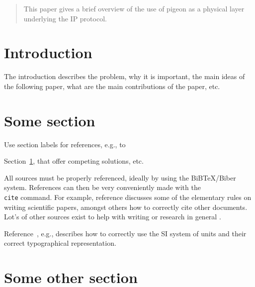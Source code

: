 %
% 


\begin{abstract}
  This paper gives a brief overview of the use of pigeon as a physical
  layer underlying  the IP protocol. 
\end{abstract}


\section{Introduction}
\label{sec:introduction}

The introduction describes the problem, why it is important, the main
ideas of the following paper, what are the main contributions of the
paper, etc. 

\section{Some section}
\label{sec:relwork}

Use section labels for references, e.g., to

Section~\ref{sec:introduction}, that offer competing solutions, etc.

All sources must be properly referenced, ideally by using the
BiBTeX/Biber system. References can then be very conveniently made
with the \texttt{\\cite} command. For example, reference
\cite{leuwen00:_handb_schol} discusses some of the elementary rules on
writing scientific papers, amongst others how to correctly cite other
documents.  Lot's of other sources exist to help with writing
\cite{williams16:_style} or research in general
\cite{booth16:_craft_resear}.

Reference~\cite{Taylor:SIGuide:95}, e.g., describes how to
correctly use the SI system of units and their correct typographical
representation.


\section{Some other section}
\label{sec:model}


